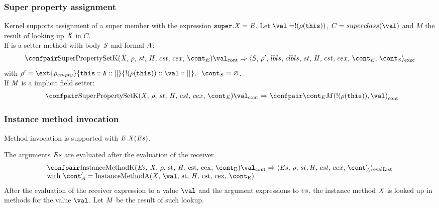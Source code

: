 \documentclass{article}
\renewcommand{\emptyset}{\varnothing}
\newcommand{\cesktrans}[2]{\ensuremath{{#1} \Rightarrow {#2}}}
\begin{document}
\subsubsection{Super property assignment}
\label{subsubsec:super-property-assignemnt}
Kernel supports assignment of a super member with the expression $\tt{super}.\mathit{X}=\mathit{E}$.
Let $\val = \deref{(\env(\this))}$, $C = \superclass{\val}$ and $M$ the result of looking up $\mathit{X}$ in $C$.\\
If is a setter method with body $\mathit{S}$ and formal $A$:
\[
  \begin{array}{lcl}
	\cesktrans{
		\contconf{\SuperPropertySetK}{\val}}{
		\execconf{\stmt}{\env'}{\lbls}{\clbls}{\handler}{\cstrace}{\cex}{\econt}{\scont}}\\
  \end{array}
\]
with $\env' =  \ext{\env_{empty}}{\this :: \formal :: []}{\deref{(\env(\this))} :: \val :: []}, \hspace{2mm}\scont = \emptyset$.\\
If $\mathit{M}$ is a implicit field setter:
\[
  \begin{array}{lcl}
	\hspace{2mm}
	\cesktrans{
		\contconf{\SuperPropertySetK}{\val}}{
		\contconf{\econt}{M(\deref{(\env(\this))}, \val)}}
  \end{array}
\]
\subsubsection{Instance method invocation}
\label{subsubsec:instance-method-invoc}
Method invocation is supported with $\mathit{E}.\mathit{X}(\mathit{E}{s})$.

\noindent
The arguments $\mathit{E}{s}$ are evaluated after the evaluation of the receiver.
\newcommand{\InstanceMethodInvocationArgsApp}{\mathrm{InstanceMethodA(\idmeta,\,\val,\,\strace,\,\handler,\,\cstrace,\,\cex,\,\econt)}}
\[
  \begin{array}{lcl}
	\cesktrans{
		\contconf{\InstanceMethodK}{\val}}{
		\evallistconf{\expressionsmeta}{\env}{\strace}{\cstrace}{\cex}{\acont'}}
	\\
	\textrm{with } \acont' = \InstanceMethodInvocationArgsApp
  \end{array}
\]
\noindent
After the evaluation of the receiver expression to a value $\val$ and the argument expressions to $vs$, the instance method $\mathit{X}$ is looked up in methods for the value $\val$.
Let $\mathit{M}$ be the result of such lookup.
\end{document}
